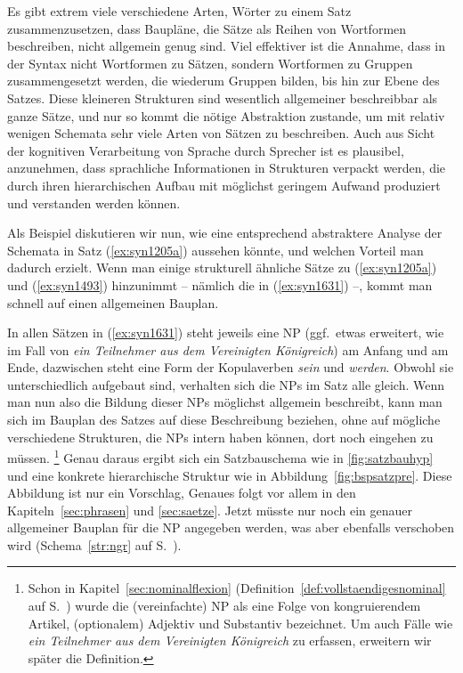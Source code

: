 Es gibt extrem viele verschiedene Arten, Wörter zu einem Satz zusammenzusetzen, dass Baupläne, die Sätze als Reihen von Wortformen beschreiben, nicht allgemein genug sind.
Viel effektiver ist die Annahme, dass in der Syntax nicht Wortformen zu Sätzen, sondern Wortformen zu Gruppen zusammengesetzt werden, die wiederum Gruppen bilden, bis hin zur Ebene des Satzes.
Diese kleineren Strukturen sind wesentlich allgemeiner beschreibbar als ganze Sätze, und nur so kommt die nötige Abstraktion zustande, um mit relativ wenigen Schemata sehr viele Arten von Sätzen zu beschreiben.
Auch aus Sicht der kognitiven Verarbeitung von Sprache durch Sprecher ist es plausibel, anzunehmen, dass sprachliche Informationen in Strukturen verpackt werden, die durch ihren hierarchischen Aufbau mit möglichst geringem Aufwand produziert und verstanden werden können.

Als Beispiel diskutieren wir nun, wie eine entsprechend abstraktere Analyse der Schemata in Satz (\ref{ex:syn1205a}) aussehen könnte, und welchen Vorteil man dadurch erzielt.
Wenn man einige strukturell ähnliche Sätze zu (\ref{ex:syn1205a}) und (\ref{ex:syn1493}) hinzunimmt -- nämlich die in (\ref{ex:syn1631}) --, kommt man schnell auf einen allgemeinen Bauplan.

\begin{exe}
  \ex\label{ex:syn1631}
  \begin{xlist}
  \end{xlist}
\end{exe}

In allen Sätzen in (\ref{ex:syn1631}) steht jeweils eine NP (ggf.\ etwas erweitert, wie im Fall von \textit{ein Teilnehmer aus dem Vereinigten Königreich}) am Anfang und am Ende, dazwischen steht eine Form der Kopulaverben \textit{sein} und \textit{werden}.
Obwohl sie unterschiedlich aufgebaut sind, verhalten sich die NPs im Satz alle gleich.
Wenn man nun also die Bildung dieser NPs möglichst allgemein beschreibt, kann man sich im Bauplan des Satzes auf diese Beschreibung beziehen, ohne auf mögliche verschiedene Strukturen, die NPs intern haben können, dort noch eingehen zu müssen.%
\footnote{Schon in Kapitel~\ref{sec:nominalflexion} (Definition~\ref{def:vollstaendigesnominal} auf S.~\pageref{def:vollstaendigesnominal}) wurde die (vereinfachte) NP als eine Folge von kongruierendem Artikel, (optionalem) Adjektiv und Substantiv bezeichnet.
Um auch Fälle wie \textit{ein Teilnehmer aus dem Vereinigten Königreich} zu erfassen, erweitern wir später die Definition.}
Genau daraus ergibt sich ein Satzbauschema wie in \ref{fig:satzbauhyp} und eine konkrete hierarchische Struktur wie in Abbildung~\ref{fig:bspsatzpre}.
Diese Abbildung ist nur ein Vorschlag, Genaues folgt vor allem in den Kapiteln~\ref{sec:phrasen} und \ref{sec:saetze}.
Jetzt müsste nur noch ein genauer allgemeiner Bauplan für die NP angegeben werden, was aber ebenfalls verschoben wird (Schema~\ref{str:ngr} auf S.~\pageref{str:ngr}).

